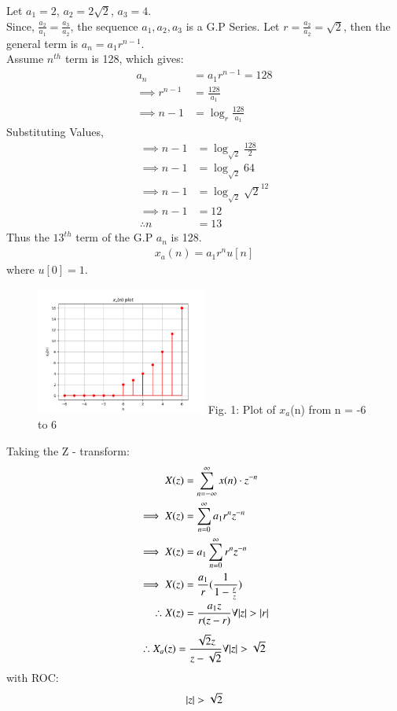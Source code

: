 \documentclass[journal,12pt,twocolumn]{IEEEtran}
\theoremstyle{remark}
\begin{document}
Let $a_1 = 2$, $a_2 = 2\sqrt{2}$, $a_3 = 4$.\\
Since, $\frac{a_2}{a_1} = \frac{a_3}{a_2}$, the sequence $a_1, a_2, a_3$ is a G.P Series.
Let $r = \frac{a_2}{a_2} = \sqrt{2}$, then the general term is $a_n = a_1 r^{n-1}$.\\
Assume $n^{th}$ term is 128, which gives: 
\begin{align}
    a_n &= a_1 r^{n-1} = 128\\
    \implies r^{n-1} &= \frac{128}{a_1}\\
    \implies n - 1 &= \log_{r}{\frac{128}{a_1}}
\end{align}
Substituting Values,
\begin{align}
    \implies n - 1 &= \log_{\sqrt{2}}{\frac{128}{2}}\\
    \implies n - 1 &= \log_{\sqrt{2}}{64}\\
    \implies n - 1 &= \log_{\sqrt{2}}{\sqrt{2}^{12}}\\
    \implies n - 1 &= 12\\
    \therefore n &= 13
\end{align}
Thus the $13^{th}$ term of the G.P $a_n$ is 128.\\ 
\begin{align}  x_a(n) = a_1r^{n}u[n]  \end{align} where $u[0] = 1$.
\begin{figure}[h!]
    \centering
    \includegraphics[width=0.5\textwidth]{figs/a.png}
    Fig. 1: Plot of $x_a$(n) from n = -6 to 6
    \label{fig:img1}
\end{figure}
Taking the Z - transform:
\begin{align}
    X(z) &= \sum_{n = -\infty}^{\infty}{x(n) \cdot z^{-n}}\\
    \implies X(z) &= \sum_{n = 0}^{\infty}{a_1r^{n}z^{-n}}\\
    \implies X(z) &= a_1\sum_{n = 0}^{\infty}{r^n z^{-n}}\\
    \implies X(z) &= \frac{a_1}{r}(\frac{1}{1 - \frac{r}{z}})\\
    \therefore X(z) &= \frac{a_1z}{r(z - r)} \forall {\left\vert z\right\vert > \left\vert r\right\vert} \label{zresult}
\end{align}
\begin{align}
    \therefore X_a(z) = \frac{\sqrt{2}z}{z - \sqrt{2}}\forall {\left\vert z\right\vert > \sqrt{2}}
\end{align}
with ROC: \[ \left\vert z\right\vert > \sqrt{2} \]
\end{document}

